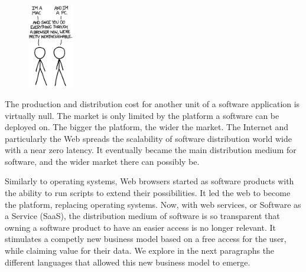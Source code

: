 \begin{figure}
  \vspace{-27pt}
  \begin{center}
    \includegraphics[width=0.18\textwidth]{../ressources/Mac-PC.png}
  \end{center}
  \vspace{-20pt}
\end{figure}

The production and distribution cost for another unit of a software application is virtually null.
The market is only limited by the platform a software can be deployed on.
The bigger the platform, the wider the market.
The Internet and particularly the Web spreads the scalability of software distribution world wide with a near zero latency.
It eventually became the main distribution medium for software, and the wider market there can possibly be.

Similarly to operating systems, Web browsers started as software products with the ability to run scripts to extend their possibilities.
It led the web to become the platform, replacing operating systems.
Now, with web services, or Software as a Service (SaaS), the distribution medium of software is so transparent that owning a software product to have an easier access is no longer relevant.
It stimulates a competly new business model based on a free access for the user, while claiming value for their data.
We explore in the next paragraphs the different languages that allowed this new business model to emerge.

